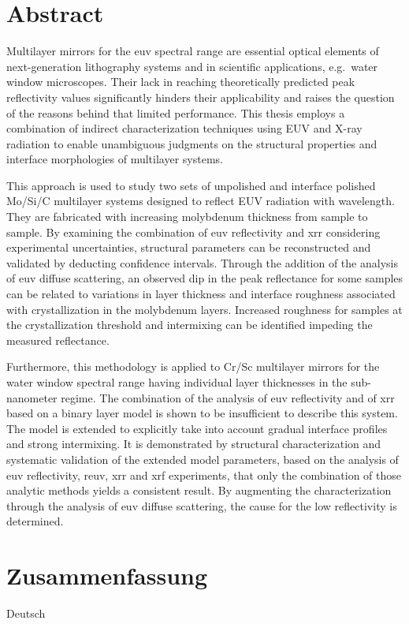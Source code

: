\section*{Abstract}

\thispagestyle{empty}

    Multilayer mirrors for the \gls{euv} spectral range are essential optical elements of next-generation lithography systems and in scientific applications, e.g.~water window microscopes. Their lack in reaching theoretically predicted peak reflectivity values significantly hinders their applicability and raises the question of the reasons behind that limited performance. This thesis employs a combination of indirect characterization techniques using EUV and X-ray radiation to enable unambiguous judgments on the structural properties and interface morphologies of multilayer systems.
    
    This approach is used to study two sets of unpolished and interface polished Mo/Si/C multilayer systems designed to reflect EUV radiation with  wavelength. They are fabricated with increasing molybdenum thickness from sample to sample. By examining the combination of \gls{euv} reflectivity and \gls{xrr} considering experimental uncertainties, structural parameters can be reconstructed and validated by deducting confidence intervals. Through the addition of the analysis of \gls{euv} diffuse scattering, an observed dip in the peak reflectance for some samples can be related to variations in layer thickness and interface roughness associated with crystallization in the molybdenum layers. Increased roughness for samples at the crystallization threshold and intermixing can be identified impeding the measured reflectance.
    
    Furthermore, this methodology is applied to Cr/Sc multilayer mirrors for the water window spectral range having individual layer thicknesses in the sub-nanometer regime. The combination of the analysis of \gls{euv} reflectivity and of \glsdesc{xrr} based on a binary layer model is shown to be insufficient to describe this system. The model is extended to explicitly take into account gradual interface profiles and strong intermixing. It is demonstrated by structural characterization and systematic validation of the extended model parameters, based on the analysis of \gls{euv} reflectivity, \gls{reuv}, \gls{xrr} and \gls{xrf} experiments, that only the combination of those analytic methods yields a consistent result. By augmenting the characterization through the analysis of \gls{euv} diffuse scattering, the cause for the low reflectivity is determined.

\cleardoublepage

\thispagestyle{empty}

\section*{Zusammenfassung}
    
    Deutsch

\cleardoublepage
